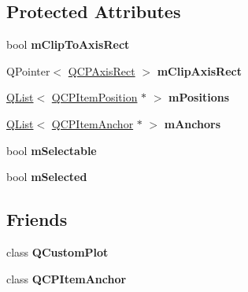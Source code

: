 \subsection*{Protected Attributes}
\begin{DoxyCompactItemize}
\item 
\mbox{\label{class_q_c_p_abstract_item_ad2a70ff6b658fcb84a9427f69d3f587d}} 
bool {\bfseries m\+Clip\+To\+Axis\+Rect}
\item 
\mbox{\label{class_q_c_p_abstract_item_a2e1ce3bb8bfe90d4ed98eb9981e72212}} 
Q\+Pointer$<$ \hyperlink{class_q_c_p_axis_rect}{Q\+C\+P\+Axis\+Rect} $>$ {\bfseries m\+Clip\+Axis\+Rect}
\item 
\mbox{\label{class_q_c_p_abstract_item_a3d628e29ed9af64d49733d6520330adc}} 
\hyperlink{class_q_list}{Q\+List}$<$ \hyperlink{class_q_c_p_item_position}{Q\+C\+P\+Item\+Position} $\ast$ $>$ {\bfseries m\+Positions}
\item 
\mbox{\label{class_q_c_p_abstract_item_a2790b98b4890492055ad4a1688287536}} 
\hyperlink{class_q_list}{Q\+List}$<$ \hyperlink{class_q_c_p_item_anchor}{Q\+C\+P\+Item\+Anchor} $\ast$ $>$ {\bfseries m\+Anchors}
\item 
\mbox{\label{class_q_c_p_abstract_item_ad81eb35c8726a0f458db9df9732e0e41}} 
bool {\bfseries m\+Selectable}
\item 
\mbox{\label{class_q_c_p_abstract_item_a4bdb3457dad1d268c0f78a44152b9645}} 
bool {\bfseries m\+Selected}
\end{DoxyCompactItemize}
\subsection*{Friends}
\begin{DoxyCompactItemize}
\item 
\mbox{\label{class_q_c_p_abstract_item_a00f8b42d059625f815808a7cc99c2f04}} 
class {\bfseries Q\+Custom\+Plot}
\item 
\mbox{\label{class_q_c_p_abstract_item_a3d9baa9eac2ae5c3cc42262550aba401}} 
class {\bfseries Q\+C\+P\+Item\+Anchor}
\end{DoxyCompactItemize}


